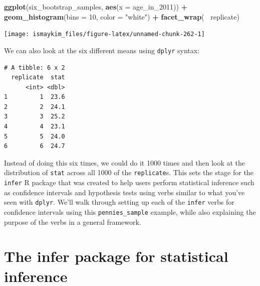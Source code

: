 \documentclass[12pt, krantz2,]{krantz}
\makeatletter
\newenvironment{Shaded}{\begin{snugshade}}{\end{snugshade}}
\newcommand{\DataTypeTok}[1]{\textcolor[rgb]{0.27,0.27,0.27}{#1}}
\newcommand{\DecValTok}[1]{\textcolor[rgb]{0.06,0.06,0.06}{#1}}
\newcommand{\KeywordTok}[1]{\textcolor[rgb]{0.27,0.27,0.27}{\textbf{#1}}}
\newcommand{\NormalTok}[1]{#1}
\newcommand{\OperatorTok}[1]{\textcolor[rgb]{0.43,0.43,0.43}{\textbf{#1}}}
\newcommand{\StringTok}[1]{\textcolor[rgb]{0.5,0.5,0.5}{#1}}
\newenvironment{kframe}{%
\medskip{}
\setlength{\fboxsep}{.8em}
 \def\at@end@of@kframe{}%
 \ifinner\ifhmode%
  \def\at@end@of@kframe{\end{minipage}}%
  \begin{minipage}{\columnwidth}%
 \fi\fi%
 \def\FrameCommand##1{\hskip\@totalleftmargin \hskip-\fboxsep
 \colorbox{shadecolor}{##1}\hskip-\fboxsep
     \hskip-\linewidth \hskip-\@totalleftmargin \hskip\columnwidth}%
 \MakeFramed {\advance\hsize-\width
   \@totalleftmargin\z@ \linewidth\hsize
   \@setminipage}}%
 {\par\unskip\endMakeFramed%
 \at@end@of@kframe}
\renewenvironment{Shaded}{\begin{kframe}}{\end{kframe}}
\makeatother
\begin{document}
\begin{Shaded}
\begin{Highlighting}[]
\KeywordTok{ggplot}\NormalTok{(six_bootstrap_samples, }\KeywordTok{aes}\NormalTok{(}\DataTypeTok{x =}\NormalTok{ age_in_}\DecValTok{2011}\NormalTok{)) }\OperatorTok{+}
\StringTok{  }\KeywordTok{geom_histogram}\NormalTok{(}\DataTypeTok{bins =} \DecValTok{10}\NormalTok{, }\DataTypeTok{color =} \StringTok{"white"}\NormalTok{) }\OperatorTok{+}
\StringTok{  }\KeywordTok{facet_wrap}\NormalTok{(}\OperatorTok{~}\StringTok{ }\NormalTok{replicate)}
\end{Highlighting}
\end{Shaded}

\begin{center}\texttt{[image: ismaykim\_files/figure-latex/unnamed-chunk-262-1]} \end{center}

We can also look at the six different means using \texttt{dplyr} syntax:

\begin{Shaded}
\end{Shaded}

\begin{verbatim}
# A tibble: 6 x 2
  replicate  stat
      <int> <dbl>
1         1  23.6
2         2  24.1
3         3  25.2
4         4  23.1
5         5  24.0
6         6  24.7
\end{verbatim}

Instead of doing this six times, we could do it 1000 times and then look at the distribution of \texttt{stat} across all 1000 of the \texttt{replicate}s. This sets the stage for the \texttt{infer} R package \citep{R-infer} that was created to help users perform statistical inference such as confidence intervals and hypothesis tests using verbs similar to what you've seen with \texttt{dplyr}. We'll walk through setting up each of the \texttt{infer} verbs for confidence intervals using this \texttt{pennies\_sample} example, while also explaining the purpose of the verbs in a general framework.

\hypertarget{the-infer-package-for-statistical-inference}{%
\section{The infer package for statistical inference}\label{the-infer-package-for-statistical-inference}}
\end{document}
